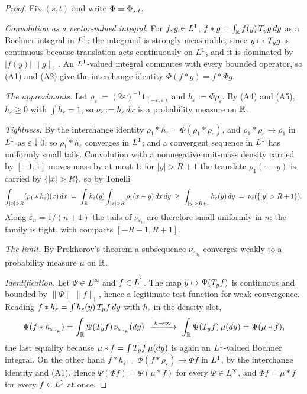 \begin{proof}
Fix $(s,t)$ and write $\Phi = \Phi_{s,t}$.

\emph{Convolution as a vector-valued integral.} For $f, g \in L^1$,
$f * g = \int_{\mathbb{R}} f(y)\,T_{y}g\,dy$ as a Bochner integral in $L^1$: the integrand is
strongly measurable, since $y \mapsto T_{y}g$ is continuous because translation acts
continuously on $L^1$, and it is dominated by $|f(y)|\,\|g\|_1$. An $L^1$-valued integral commutes with every bounded operator, so (A1) and
(A2) give the interchange identity $\Phi(f * g) = f * \Phi g$.

\emph{The approximants.} Let $\rho_\varepsilon := (2\varepsilon)^{-1}\mathbf 1_{(-\varepsilon,\varepsilon)}$
and $h_\varepsilon := \Phi\rho_\varepsilon$. By (A4) and (A5), $h_\varepsilon \ge 0$ with
$\int h_\varepsilon = 1$, so $\nu_\varepsilon := h_\varepsilon\,dx$ is a probability measure on
$\mathbb{R}$.

\emph{Tightness.} By the interchange identity $\rho_1 * h_\varepsilon = \Phi(\rho_1 *
\rho_\varepsilon)$, and $\rho_1 * \rho_\varepsilon \to \rho_1$ in $L^1$ as
$\varepsilon \downarrow 0$, so $\rho_1 * h_\varepsilon$ converges in $L^1$; and a convergent
sequence in $L^1$ has uniformly small tails. Convolution with a nonnegative unit-mass density
carried by $[-1,1]$ moves mass by at most $1$: for $|y| > R+1$ the translate
$\rho_1(\cdot - y)$ is carried by $\{|x| > R\}$, so by Tonelli
\[
  \int_{|x| > R} (\rho_1 * h_\varepsilon)(x)\,dx
  \;=\; \int_\RR h_\varepsilon(y)\int_{|x|>R}\rho_1(x-y)\,dx\,dy
  \;\ge\; \int_{|y| > R+1} h_\varepsilon(y)\,dy
  \;=\; \nu_\varepsilon(\{|y| > R+1\}).
\]
Along $\varepsilon_n = 1/(n+1)$ the tails of $\nu_{\varepsilon_n}$ are therefore small
uniformly in $n$: the family is tight, with compacts $[-R-1, R+1]$.

\emph{The limit.} By Prokhorov's theorem a subsequence $\nu_{\varepsilon_{n_k}}$ converges
weakly to a probability measure $\mu$ on $\mathbb{R}$.

\emph{Identification.} Let $\Psi \in L^\infty$ and $f \in L^1$. The map
$y \mapsto \Psi(T_{y}f)$ is continuous and bounded by $\|\Psi\|\,\|f\|_1$, hence a legitimate
test function for weak convergence. Reading $f * h_\varepsilon = \int h_\varepsilon(y)\,T_{y}f\,dy$
with $h_\varepsilon$ in the density slot,
\[
  \Psi(f * h_{\varepsilon_{n_k}}) = \int_{\mathbb{R}} \Psi(T_{y}f)\,\nu_{\varepsilon_{n_k}}(dy)
  \ \xrightarrow{\ k \to \infty\ }\ \int_{\mathbb{R}} \Psi(T_{y}f)\,\mu(dy) = \Psi(\mu * f),
\]
the last equality because $\mu * f = \int T_{y}f\,\mu(dy)$ is again an $L^1$-valued Bochner
integral. On the other hand $f * h_\varepsilon = \Phi(f * \rho_\varepsilon) \to \Phi f$ in
$L^1$, by the interchange identity and (A1). Hence $\Psi(\Phi f) = \Psi(\mu * f)$ for every
$\Psi \in L^\infty$, and $\Phi f = \mu * f$ for every $f \in L^1$ at once.


\end{proof}
